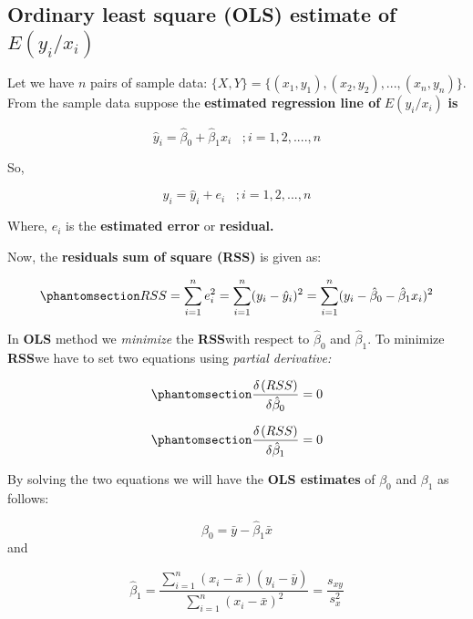 \documentclass[
  11pt,
  letterpaper,
  DIV=11,
  numbers=noendperiod]{scrreprt}
\begin{document}
\subsection{\texorpdfstring{Ordinary least square (OLS) estimate of
\(E(y_i/x_i)\)}{Ordinary least square (OLS) estimate of E(y\_i/x\_i)}}\label{ordinary-least-square-ols-estimate-of-ey_ix_i}

Let we have \(n\) pairs of sample data:
\(\{X,Y\}=\{ (x_1,y_1), (x_2,y_2),..., (x_n, y_n) \}\). From the sample
data suppose the \textbf{estimated regression line of} \(E(y_i/x_i)\)
\textbf{is}

\[\hat y_i= \hat \beta_0+\hat \beta_1 x_i \hspace {10pt}; i=1,2,....,n\]

So,

\[y_i=\hat y_i +e_i \hspace{10pt} ; i=1,2, ..., n\]

Where, \(e_i\) is the \textbf{estimated error} or \textbf{residual.}

Now, the \textbf{residuals sum of square (RSS)} is given as:

\begin{equation}\phantomsection\label{eq-ssr}{RSS=\sum_{i=1}^n e_i^2=\sum_{i=1}^n (y_i-\hat y_i)^2=\sum_{i=1}^n (y_i-\hat \beta_0-\hat \beta_1x_i)^2}\end{equation}

In \textbf{OLS} method we \emph{minimize} the \textbf{RSS}with respect
to \(\hat \beta_0\) and \(\hat \beta_1\). To minimize \textbf{RSS}we
have to set two equations using \emph{partial derivative:}

\begin{equation}\phantomsection\label{eq-ols1}{\frac{\delta \hspace{1pt} (RSS)}{\delta \hat \beta_0}=0}\end{equation}

\begin{equation}\phantomsection\label{eq-ols2}{\frac{\delta \hspace{1pt} (RSS)}{\delta \hat \beta_1}=0}\end{equation}

By solving the two equations we will have the \textbf{OLS estimates} of
\(\beta_0\) and \(\beta_1\) as follows:

\[\hat \beta_0=\bar y-\hat \beta_1 \bar x\] and

\[\hat \beta_1=\frac{\sum_{i=1}^n (x_i-\bar x)(y_i-\bar y)} {\sum_{i=1}^n (x_i-\bar x)^2}=\frac{s_{xy}}{s^2_x}\]
\end{document}
